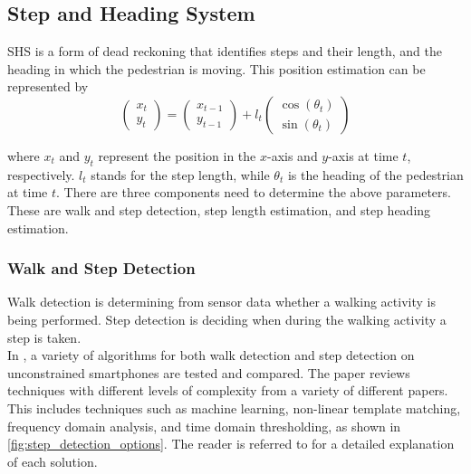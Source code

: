 \subsection{Step and Heading System}
\label{sec:rw-SHS}
\ac{SHS} is a form of dead reckoning that identifies steps and their length, and the heading in which the pedestrian is moving. This position estimation can be represented by \cite{MunozDiaz2019}
\begin{equation}
	\label{eq:SHS_dynamic_model}
	\left(\begin{array}{l}
		x_t \\
		y_t
	\end{array}\right) 
	=
	\left(\begin{array}{l}
		x_{t-1} \\
		y_{t-1}
	\end{array}\right) 
	+l_{t} \left(\begin{array}{l}
		\cos \left(\theta_{t}\right) \\
		\sin \left(\theta_{t}\right)
	\end{array}\right)
\end{equation}

where $x_{t}$  and  $y_{t}$ represent the position in the $x$-axis and $y$-axis at time  $t$, respectively. $l_{t}$ stands for the step length, while $\theta_{t}$ is the heading of the pedestrian at time $t$.
There are three components need to determine the above parameters. These are walk and step detection, step length estimation, and step heading estimation.


\subsubsection{Walk and Step Detection}
\label{sec:rw - step detection}
Walk detection is determining from sensor data whether a walking activity is being performed. Step detection is deciding when during the walking activity a step is taken. \\
In \cite{Brajdic2013}, a variety of algorithms for both walk detection and step detection on unconstrained smartphones are tested and compared. The paper reviews techniques with different levels of complexity from a variety of different papers. This includes techniques such as machine learning, non-linear template matching, frequency domain analysis, and time domain thresholding, as shown in \cref{fig:step_detection_options}. The reader is referred to \cite{Brajdic2013} for a detailed explanation of each solution.

